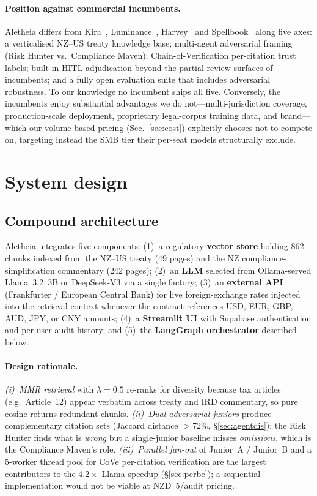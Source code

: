 \documentclass{article}
\begin{document}
\paragraph{Position against commercial incumbents.}
Aletheia differs from Kira~\cite{kira2023}, Luminance~\cite{luminance2022},
Harvey~\cite{harvey2023} and Spellbook~\cite{spellbook2024} along five
axes: a verticalised NZ--US treaty knowledge base; multi-agent
adversarial framing (Risk Hunter vs.\ Compliance Maven);
Chain-of-Verification per-citation trust labels; built-in HITL
adjudication beyond the partial review surfaces of incumbents; and a
fully open evaluation suite that includes adversarial robustness. To
our knowledge no incumbent ships all five. Conversely, the incumbents
enjoy substantial advantages we do not---multi-jurisdiction coverage,
production-scale deployment, proprietary legal-corpus training data,
and brand---which our volume-based pricing
(Sec.~\ref{sec:cost}) explicitly chooses not to compete on, targeting
instead the SMB tier their per-seat models structurally exclude.

\section{System design}
\label{sec:design}

\subsection{Compound architecture}
Aletheia integrates five components: (1)~a regulatory \textbf{vector store}
holding 862 chunks indexed from the NZ--US treaty (49 pages) and the NZ
compliance-simplification commentary (242 pages); (2)~an \textbf{LLM}
selected from Ollama-served Llama~3.2~3B or DeepSeek-V3 via a single
factory; (3)~an \textbf{external API} (Frankfurter / European Central
Bank) for live foreign-exchange rates injected into the retrieval
context whenever the contract references USD, EUR, GBP, AUD, JPY, or CNY
amounts; (4)~a \textbf{Streamlit UI} with Supabase authentication and
per-user audit history; and (5)~the \textbf{LangGraph orchestrator}
described below.

\paragraph{Design rationale.}
\emph{(i)~MMR retrieval} \cite{carbonell1998mmr} with $\lambda{=}0.5$
re-ranks for diversity because tax articles (e.g.\ Article~12) appear
verbatim across treaty and IRD commentary, so pure cosine returns
redundant chunks.
\emph{(ii)~Dual adversarial juniors} produce complementary citation
sets (Jaccard distance $\!>\!72\%$, §\ref{sec:agentdis}): the Risk
Hunter finds what is \emph{wrong} but a single-junior baseline misses
\emph{omissions}, which is the Compliance Maven's role.
\emph{(iii)~Parallel fan-out} of Junior~A / Junior~B and a 5-worker
thread pool for CoVe per-citation verification are the largest
contributors to the $4.2\times$ Llama speedup (§\ref{sec:perbe}); a
sequential implementation would not be viable at NZD~5/audit pricing.
\end{document}
